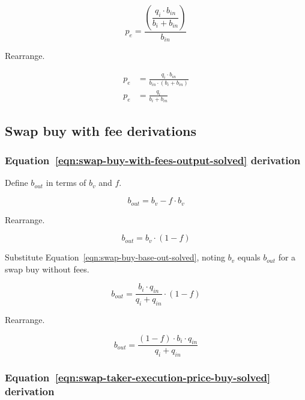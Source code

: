 \documentclass[table, twocolumn]{article}
\begin{document}
\begin{equation}
	p_e = \dfrac{\left(\dfrac{q_i \cdot b_{in}}{b_i + b_{in}}\right)}{b_{in}} \nonumber
\end{equation}

Rearrange.

\begin{align}
	p_e & = \frac{q_i \cdot b_{in}}{b_{in} \cdot (b_i + b_{in})} \nonumber \\
	p_e & = \frac{q_i}{b_i + b_{in}} \nonumber
\end{align}

\subsection{Swap buy with fee  derivations}\label{ssec:swap-buy-with-fee-derivations}

\subsubsection{Equation~\ref{eqn:swap-buy-with-fees-output-solved} derivation}%
\label{sssec:equation-eqn-swap-buy-with-fees-output-solved-derivation}

Define $b_{out}$ in terms of $b_v$ and $f$.

\begin{equation}
  b_{out} = b_v - f \cdot b_v \nonumber
\end{equation}

Rearrange.

\begin{equation}
  b_{out} = b_v \cdot (1 - f) \nonumber
\end{equation}

Substitute Equation~\ref{eqn:swap-buy-base-out-solved}, noting $b_v$ equals $b_{out}$
for a swap buy without fees.

\begin{equation}
  b_{out} = \frac{b_i \cdot q_{in}}{q_i + q_{in}} \cdot (1 - f) \nonumber
\end{equation}

Rearrange.

\begin{equation}
  b_{out} = \frac{(1 - f) \cdot b_i \cdot q_{in}}{q_i + q_{in}} \nonumber
\end{equation}

\subsubsection{Equation~\ref{eqn:swap-taker-execution-price-buy-solved} derivation}%
\label{sssec:equation-eqn-swap-taker-execution-price-buy-solved-derivation}
\end{document}
